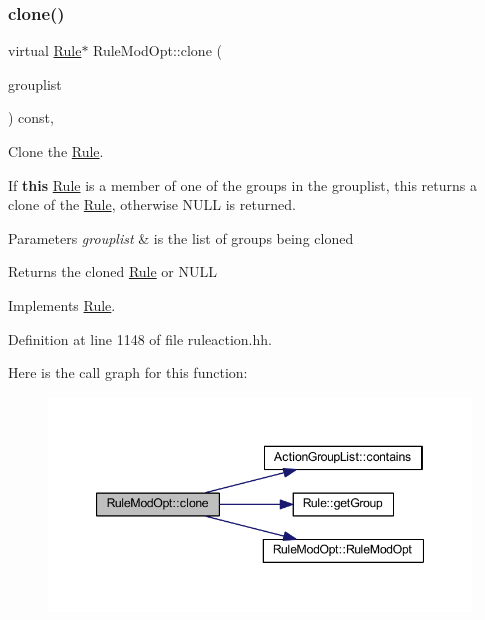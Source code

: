 \subsubsection{\texorpdfstring{clone()}{clone()}}
{\footnotesize\ttfamily virtual \mbox{\hyperlink{class_rule}{Rule}}$\ast$ Rule\+Mod\+Opt\+::clone (\begin{DoxyParamCaption}\item[{const \mbox{\hyperlink{class_action_group_list}{Action\+Group\+List}} \&}]{grouplist }\end{DoxyParamCaption}) const\hspace{0.3cm}{\ttfamily [inline]}, {\ttfamily [virtual]}}



Clone the \mbox{\hyperlink{class_rule}{Rule}}. 

If {\bfseries{this}} \mbox{\hyperlink{class_rule}{Rule}} is a member of one of the groups in the grouplist, this returns a clone of the \mbox{\hyperlink{class_rule}{Rule}}, otherwise N\+U\+LL is returned. 
\begin{DoxyParams}{Parameters}
{\em grouplist} & is the list of groups being cloned \\
\hline
\end{DoxyParams}
\begin{DoxyReturn}{Returns}
the cloned \mbox{\hyperlink{class_rule}{Rule}} or N\+U\+LL 
\end{DoxyReturn}


Implements \mbox{\hyperlink{class_rule_a70de90a76461bfa7ea0b575ce3c11e4d}{Rule}}.



Definition at line 1148 of file ruleaction.\+hh.

Here is the call graph for this function\+:
\nopagebreak
\begin{figure}[H]
\begin{center}
\leavevmode
\includegraphics[width=347pt]{class_rule_mod_opt_a45d5b1d80fa9bc5e5cd9dd4b134aa09b_cgraph}
\end{center}
\end{figure}
\mbox{\label{class_rule_mod_opt_a50bda7e2da175d530691d33dd8294172}} 
